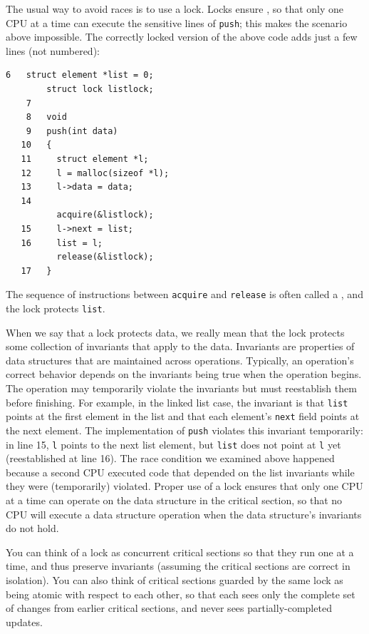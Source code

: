 The usual way to avoid races is to use a lock.
Locks ensure
,
so that only one CPU at a time can execute 
the sensitive lines of
\lstinline{push};
this makes the scenario above impossible.
The correctly locked version of the above code
adds just a few lines (not numbered):
\begin{lstlisting}[]
    6	struct element *list = 0;
     	struct lock listlock;
    7	
    8	void
    9	push(int data)
   10	{
   11	  struct element *l;
   12	  l = malloc(sizeof *l);
   13	  l->data = data;
   14	
     	  acquire(&listlock);
   15	  l->next = list;
   16	  list = l;
     	  release(&listlock);
   17	}
\end{lstlisting}
The sequence of instructions between
\lstinline{acquire}
and
\lstinline{release}
is often called a
,
and the lock protects
\lstinline{list}.

When we say that a lock protects data, we really mean
that the lock protects some collection of invariants
that apply to the data.
Invariants are properties of data structures that
are maintained across operations.
Typically, an operation's correct behavior depends
on the invariants being true when the operation
begins.  The operation may temporarily violate
the invariants but must reestablish them before
finishing.
For example, in the linked list case, the invariant is that
\lstinline{list}
points at the first element in the list
and that each element's
\lstinline{next}
field points at the next element.
The implementation of
\lstinline{push}
violates this invariant temporarily: in line 15,
\lstinline{l}
points
to the next list element, but
\lstinline{list}
does not point at
\lstinline{l}
yet (reestablished at line 16).
The race condition we examined above
happened because a second CPU executed
code that depended on the list invariants
while they were (temporarily) violated.
Proper use of a lock ensures that only one CPU at a time
can operate on the data structure in the critical section, so that
no CPU will execute a data structure operation when the 
data structure's invariants do not hold.

You can think of a lock as
concurrent critical sections so that they run one at a time,
and thus preserve invariants (assuming the critical sections
are correct in isolation).
You can also think of critical sections guarded by the same lock as being
atomic with respect to each other,
so that each sees only the complete set of
changes from earlier critical sections, and never sees
partially-completed updates.

